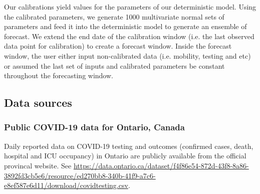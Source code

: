 \documentclass[12pt]{article}\usepackage[]{graphicx}\usepackage[]{color}
\begin{document}
Our calibrations yield values for the parameters of our deterministic model. 
Using the calibrated parameters, we generate 1000 multivariate normal sets of parameters and feed it into the deterministic model to generate an ensemble of forecast. We extend the end date of the calibration window (i.e. the last observed data point for calibration) to create a forecast window. Inside the forecast window, the user either input non-calibrated data (i.e. mobility, testing and etc) or assumed the last set of inputs and calibrated parameters be constant throughout the forecasting window. 

\subsection{Data sources}

% 
% 

\subsubsection*{Public COVID-19 data for Ontario, Canada}


Daily reported data on COVID-19 testing and outcomes (confirmed cases, death, hospital and ICU occupancy) in Ontario are publicly available from the official provincal website. See
\url{https://data.ontario.ca/dataset/f4f86e54-872d-43f8-8a86-3892fd3cb5e6/resource/ed270bb8-340b-41f9-a7c6-e8ef587e6d11/download/covidtesting.csv}.
\end{document}
